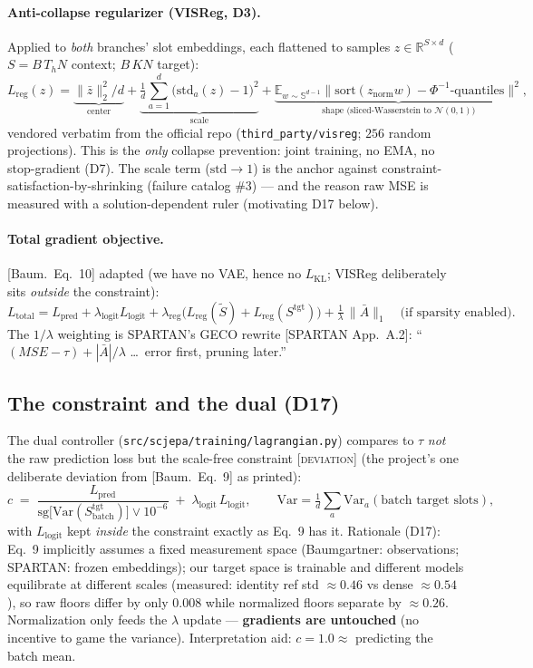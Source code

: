 \documentclass[11pt]{article}
\newcommand{\code}[1]{\texttt{\small #1}}
\newcommand{\paper}[1]{\textcolor{blue!60!black}{[#1]}}
\newcommand{\dev}{\textcolor{red!70!black}{[\textsc{deviation}]}}
\newcommand{\Abar}{\bar{A}}
\newcommand{\E}{\mathbb{E}}
\begin{document}
\paragraph{Anti-collapse regularizer (VISReg, D3).} Applied to \emph{both} branches'
slot embeddings, each flattened to samples $z \in \mathbb R^{S\times d}$
($S = B\,T_h N$ context; $B\,K N$ target):
\[
  L_{\mathrm{reg}}(z) = \underbrace{\|\bar z\|_2^2/d}_{\text{center}}
  + \underbrace{\tfrac1d\sum_{a=1}^{d}\big(\mathrm{std}_a(z) - 1\big)^2}_{\text{scale}}
  + \underbrace{\E_{w\sim \mathbb S^{d-1}}\big\|\mathrm{sort}(z_{\mathrm{norm}} w) - \Phi^{-1}\text{-quantiles}\big\|^2}_{\text{shape (sliced-Wasserstein to } \mathcal N(0,1))},
\]
vendored verbatim from the official repo (\code{third\_party/visreg}; $256$ random
projections). This is the \emph{only} collapse prevention: joint training, no EMA, no
stop-gradient (D7). The scale term ($\mathrm{std}\to1$) is the anchor against
constraint-satisfaction-by-shrinking (failure catalog \#3) --- and the reason raw MSE is
measured with a solution-dependent ruler (motivating D17 below).

\paragraph{Total gradient objective.} \paper{Baum.\ Eq.~10} adapted (we have no VAE, hence
no $L_{\mathrm{KL}}$; VISReg deliberately sits \emph{outside} the constraint):
\[
  L_{\mathrm{total}} = L_{\mathrm{pred}}
  + \lambda_{\mathrm{logit}} L_{\mathrm{logit}}
  + \lambda_{\mathrm{reg}}\big(L_{\mathrm{reg}}(\tilde S) + L_{\mathrm{reg}}(S^{\mathrm{tgt}})\big)
  + \tfrac{1}{\lambda}\,\|\Abar\|_1 \quad\text{(if sparsity enabled)}.
\]
The $1/\lambda$ weighting is SPARTAN's GECO rewrite \paper{SPARTAN App.~A.2}: ``$(MSE-\tau)
+ |\Abar|/\lambda$ \dots\ error first, pruning later.''

\subsection{The constraint and the dual (D17)}
The dual controller (\code{src/scjepa/training/lagrangian.py}) compares to $\tau$ \emph{not}
the raw prediction loss but the scale-free constraint \dev{} (the project's one deliberate
deviation from \paper{Baum.\ Eq.~9} as printed):
\[
  c \;=\; \frac{L_{\mathrm{pred}}}{\mathrm{sg}\!\big[\mathrm{Var}(S^{\mathrm{tgt}}_{\text{batch}})\big]\vee 10^{-6}}
  \;+\; \lambda_{\mathrm{logit}}\, L_{\mathrm{logit}},
  \qquad
  \mathrm{Var} = \tfrac1d\textstyle\sum_a \mathrm{Var}_a(\text{batch target slots}),
\]
with $L_{\mathrm{logit}}$ kept \emph{inside} the constraint exactly as Eq.~9 has it.
Rationale (D17): Eq.~9 implicitly assumes a fixed measurement space (Baumgartner:
observations; SPARTAN: frozen embeddings); our target space is trainable and different
models equilibrate at different scales (measured: identity ref std $\approx0.46$ vs dense
$\approx0.54$), so raw floors differ by only $0.008$ while normalized floors separate by
$\approx0.26$. Normalization only feeds the $\lambda$ update --- \textbf{gradients are
untouched} (no incentive to game the variance). Interpretation aid: $c = 1.0 \approx$
predicting the batch mean.
\end{document}
